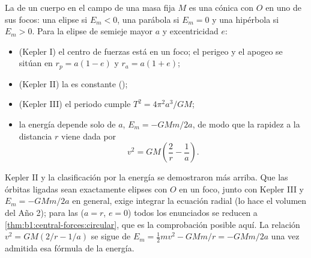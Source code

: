 \begin{theorem}\label{thm:b1:central-forces:conics}
La  de un cuerpo en el campo de una masa fija $M$ es una cónica
con $O$ en uno de sus focos: una elipse si $E_m < 0$, una parábola si
$E_m = 0$ y una hipérbola si $E_m > 0$. Para la elipse de semieje mayor
$a$ y excentricidad $e$:
\begin{itemize}
  \item (Kepler I) el centro de fuerzas está en un foco; el perigeo y el
        apogeo se sitúan en $r_p = a(1 - e)$ y $r_a = a(1 + e)$;
  \item (Kepler II) la  es constante ();
  \item (Kepler III) el periodo cumple $T^2 = 4\pi^2a^3/GM$;
  \item la energía depende solo de $a$, $E_m = -GMm/2a$, de modo que la
        rapidez a la distancia $r$ viene dada por
        \[
        v^2 = GM\left(\frac{2}{r} - \frac{1}{a}\right) .
        \]
\end{itemize}
\end{theorem}
\admitted

\begin{remark}\label{rem:b1:central-forces:admitted}
Kepler II y la clasificación por la energía se demostraron más arriba. Que
las órbitas ligadas sean exactamente elipses con $O$ en un foco, junto con
Kepler III y $E_m = -GMm/2a$ en general, exige integrar la ecuación radial
(lo hace el volumen del Año 2); para las  ($a = r$,
$e = 0$) todos los enunciados se reducen a \cref{thm:b1:central-forces:circular},
que es la comprobación posible aquí. La relación $v^2 = GM(2/r - 1/a)$ se
sigue de $E_m = \tfrac12 mv^2 - GMm/r = -GMm/2a$ una vez admitida esa
fórmula de la energía.
\end{remark}

